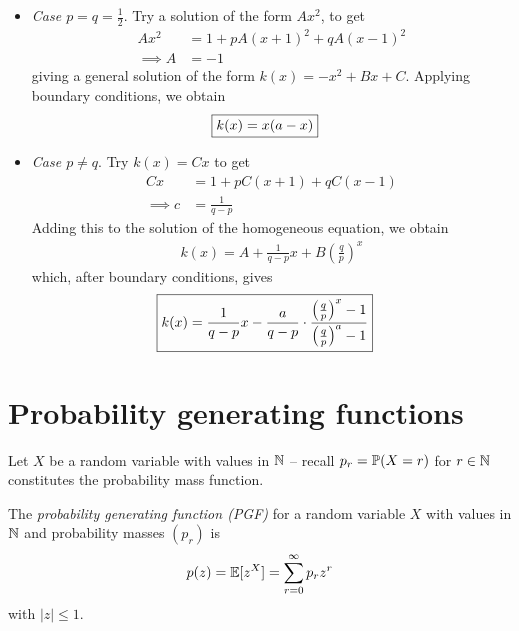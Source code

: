 \documentclass{../../template/note}
\begin{document}
    \begin{itemize}
        \item \emph{Case \(p=q=\frac 1 2\)}. Try a solution of the form \(Ax^2\), to get
        \begin{align*}
            Ax^2 &= 1 + pA(x+1)^2 + qA(x-1)^2 \\
            \implies A &= -1
        \end{align*}
        giving a general solution of the form \(k(x) = -x^2 + Bx + C\). Applying boundary conditions, we obtain
        \begin{align*}
            \Aboxed{k(x) = x(a-x)}
        \end{align*}
        \item \emph{Case \(p\neq q\)}. Try \(k(x) = Cx\) to get
        \begin{align*}
            Cx &= 1 + pC(x+1) + qC(x-1) \\
            \implies c &= \frac 1 {q-p}
        \end{align*}
        Adding this to the solution of the homogeneous equation, we obtain
        \begin{align*}
            k(x) = A + \frac 1 {q-p} x + B\left(\frac q p\right)^x
        \end{align*}
        which, after boundary conditions, gives
        \begin{align*}
            \Aboxed{k(x) = \frac 1 {q-p} x - \frac a {q-p}\cdot\frac{\left(\frac q p\right)^x - 1}{\left(\frac q p\right)^a-1}}
        \end{align*}
    \end{itemize}
    
    \section{Probability generating functions}

    Let \(X\) be a random variable with values in \(\mathbb N\) -- recall \(p_r = \mathbb P(X=r)\) for \(r \in \mathbb N\) constitutes the probability mass function.

    \begin{definition}
        The \emph{probability generating function (PGF)} for a random variable \(X\) with values in \(\mathbb N\) and probability masses \((p_r)\) is
        \begin{align*}
            p(z) = \mathbb E[z^X] = \sum_{r=0}^\infty p_r z^r
        \end{align*}
        with \(|z| \leq 1\).        
    \end{definition}
    
\end{document}
